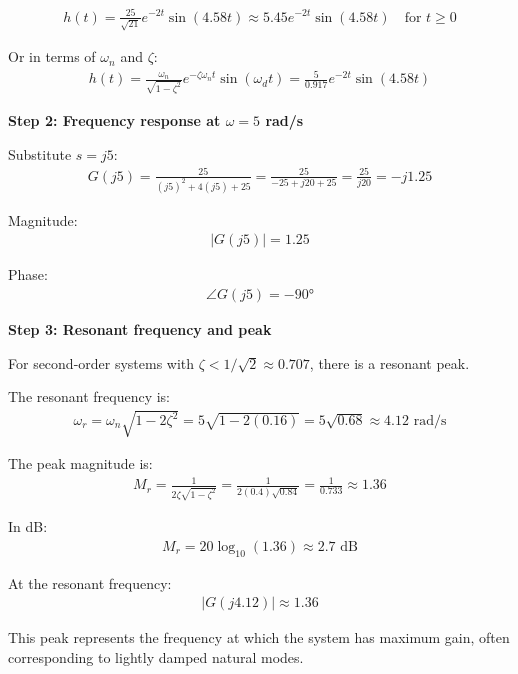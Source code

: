 \documentclass[11pt,a4paper]{article}
\begin{document}
\begin{align}
h(t) = \frac{25}{\sqrt{21}}e^{-2t}\sin(4.58t) \approx 5.45e^{-2t}\sin(4.58t) \quad \text{for } t \geq 0
\end{align}

Or in terms of $\omega_n$ and $\zeta$:
\begin{align}
h(t) = \frac{\omega_n}{\sqrt{1-\zeta^2}}e^{-\zeta\omega_n t}\sin(\omega_d t) = \frac{5}{0.917}e^{-2t}\sin(4.58t)
\end{align}

\textbf{Step 2: Frequency response at $\omega = 5$ rad/s}

Substitute $s = j5$:
\begin{align}
G(j5) = \frac{25}{(j5)^2 + 4(j5) + 25} = \frac{25}{-25 + j20 + 25} = \frac{25}{j20} = -j1.25
\end{align}

Magnitude:
\begin{align}
|G(j5)| = 1.25
\end{align}

Phase:
\begin{align}
\angle G(j5) = -90°
\end{align}

\textbf{Step 3: Resonant frequency and peak}

For second-order systems with $\zeta < 1/\sqrt{2} \approx 0.707$, there is a resonant peak.

The resonant frequency is:
\begin{align}
\omega_r = \omega_n\sqrt{1 - 2\zeta^2} = 5\sqrt{1 - 2(0.16)} = 5\sqrt{0.68} \approx 4.12 \text{ rad/s}
\end{align}

The peak magnitude is:
\begin{align}
M_r = \frac{1}{2\zeta\sqrt{1-\zeta^2}} = \frac{1}{2(0.4)\sqrt{0.84}} = \frac{1}{0.733} \approx 1.36
\end{align}

In dB:
\begin{align}
M_r = 20\log_{10}(1.36) \approx 2.7 \text{ dB}
\end{align}

At the resonant frequency:
\begin{align}
|G(j4.12)| \approx 1.36
\end{align}

This peak represents the frequency at which the system has maximum gain, often corresponding to lightly damped natural modes.
\end{document}
